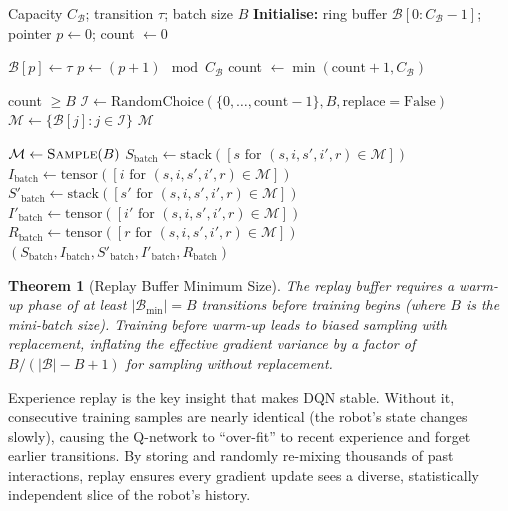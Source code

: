 \documentclass[12pt,a4paper]{article}
\theoremstyle{definition}
\theoremstyle{plain}
\newtheorem{theorem}{Theorem}[section]
\theoremstyle{remark}
\begin{document}
\begin{algorithm}[H]
\caption{Experience Replay Memory Operations}
\label{alg:replay_memory}
\begin{algorithmic}[1]
\Require Capacity $C_\mathcal{B}$; transition $\tau$; batch size $B$
\State \textbf{Initialise:} ring buffer $\mathcal{B}[0:C_\mathcal{B}-1]$; pointer $p \gets 0$; count $\gets 0$

  \State $\mathcal{B}[p] \gets \tau$
  \State $p \gets (p + 1) \mod C_\mathcal{B}$ 
  \State count $\gets \min(\text{count} + 1, C_\mathcal{B})$
\EndProcedure

  \Require count $\ge B$ 
  \State $\mathcal{I} \gets \text{RandomChoice}(\{0,\ldots,\text{count}-1\}, B, \text{replace}=\text{False})$
  \State $\mathcal{M} \gets \{\mathcal{B}[j] : j \in \mathcal{I}\}$ 
  \State \Return $\mathcal{M}$
\EndProcedure

 
  \State $\mathcal{M} \gets \Call{Sample}{B}$
  \State $S_{\text{batch}} \gets \text{stack}([s \text{ for } (s,i,s',i',r) \in \mathcal{M}])$
  \State $I_{\text{batch}} \gets \text{tensor}([i \text{ for } (s,i,s',i',r) \in \mathcal{M}])$
  \State $S'_{\text{batch}} \gets \text{stack}([s' \text{ for } (s,i,s',i',r) \in \mathcal{M}])$
  \State $I'_{\text{batch}} \gets \text{tensor}([i' \text{ for } (s,i,s',i',r) \in \mathcal{M}])$
  \State $R_{\text{batch}} \gets \text{tensor}([r \text{ for } (s,i,s',i',r) \in \mathcal{M}])$
  \State \Return $(S_{\text{batch}}, I_{\text{batch}}, S'_{\text{batch}}, I'_{\text{batch}}, R_{\text{batch}})$
\EndProcedure
\end{algorithmic}
\end{algorithm}

\begin{theorem}[Replay Buffer Minimum Size]
The replay buffer requires a warm-up phase of at least $|\mathcal{B}_{\text{min}}| = B$ transitions before training begins (where $B$ is the mini-batch size). Training before warm-up leads to biased sampling with replacement, inflating the effective gradient variance by a factor of $B / (|\mathcal{B}| - B + 1)$ for sampling without replacement.
\end{theorem}

\begin{tcolorbox}[rlbox]
Experience replay is the key insight that makes DQN stable. Without it, consecutive training samples are nearly identical (the robot's state changes slowly), causing the Q-network to ``over-fit'' to recent experience and forget earlier transitions. By storing and randomly re-mixing thousands of past interactions, replay ensures every gradient update sees a diverse, statistically independent slice of the robot's history.
\end{tcolorbox}
\end{document}
